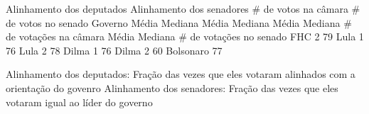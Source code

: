  Alinhamento dos deputados  Alinhamento dos senadores  # de votos na câmara   # de votos no senado  
Governo Média Mediana Média  Mediana Média Mediana # de votações na câmara Média Mediana # de votações no senado
FHC 2 79%
Lula 1 76%
Lula 2 78%
Dilma 1 76%
Dilma 2 60%
Bolsonaro 77%
          
Alinhamento dos deputados:  Fração das vezes que eles votaram alinhados com a orientação do govenro        
Alinhamento dos senadores:  Fração das vezes que eles votaram igual ao líder do governo        
